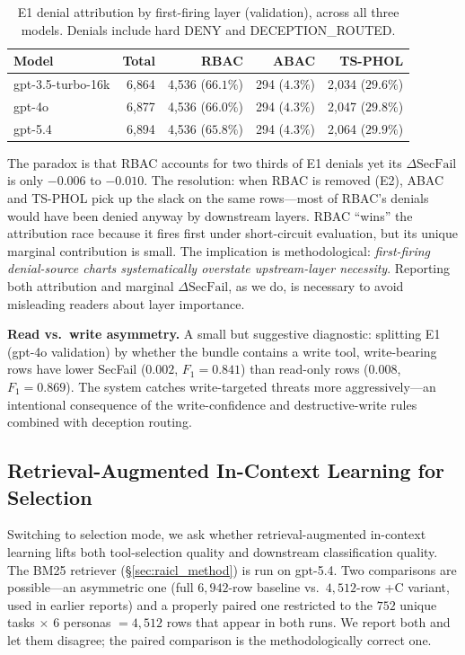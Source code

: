 \documentclass[10pt,a4paper,twocolumn]{article}
\begin{document}
\begin{table}[!t]
\centering
\caption{E1 denial attribution by first-firing layer (validation), across all three models. Denials include hard DENY and DECEPTION\_ROUTED.}
\label{tab:attribution}
\scriptsize
\setlength{\tabcolsep}{3pt}
\begin{tabular}{@{}lrrrr@{}}
\toprule
\textbf{Model} & \textbf{Total} & \textbf{RBAC} & \textbf{ABAC} & \textbf{TS-PHOL} \\
\midrule
gpt-3.5-turbo-16k & 6{,}864 & 4{,}536 ($66.1\%$) & 294 ($4.3\%$) & 2{,}034 ($29.6\%$) \\
gpt-4o            & 6{,}877 & 4{,}536 ($66.0\%$) & 294 ($4.3\%$) & 2{,}047 ($29.8\%$) \\
gpt-5.4           & 6{,}894 & 4{,}536 ($65.8\%$) & 294 ($4.3\%$) & 2{,}064 ($29.9\%$) \\
\bottomrule
\end{tabular}
\end{table}

The paradox is that RBAC accounts for two thirds of E1 denials yet its $\Delta\mathrm{SecFail}$ is only $-0.006$ to $-0.010$. The resolution: when RBAC is removed (E2), ABAC and TS-PHOL pick up the slack on the same rows---most of RBAC's denials would have been denied anyway by downstream layers. RBAC ``wins'' the attribution race because it fires first under short-circuit evaluation, but its unique marginal contribution is small. The implication is methodological: \emph{first-firing denial-source charts systematically overstate upstream-layer necessity}. Reporting both attribution and marginal $\Delta\mathrm{SecFail}$, as we do, is necessary to avoid misleading readers about layer importance.

\textbf{Read vs.\ write asymmetry.} A small but suggestive diagnostic: splitting E1 (gpt-4o validation) by whether the bundle contains a write tool, write-bearing rows have lower SecFail ($0.002$, $F_1 = 0.841$) than read-only rows ($0.008$, $F_1 = 0.869$). The system catches write-targeted threats more aggressively---an intentional consequence of the write-confidence and destructive-write rules combined with deception routing.

\subsection{Retrieval-Augmented In-Context Learning for Selection}
\label{sec:raicl}

Switching to selection mode, we ask whether retrieval-augmented in-context learning lifts both tool-selection quality and downstream classification quality. The BM25 retriever (\S\ref{sec:raicl_method}) is run on gpt-5.4. Two comparisons are possible---an asymmetric one (full $6{,}942$-row baseline vs.\ $4{,}512$-row +C variant, used in earlier reports) and a properly paired one restricted to the $752$ unique tasks $\times$ $6$ personas $=4{,}512$ rows that appear in both runs. We report both and let them disagree; the paired comparison is the methodologically correct one.
\end{document}

